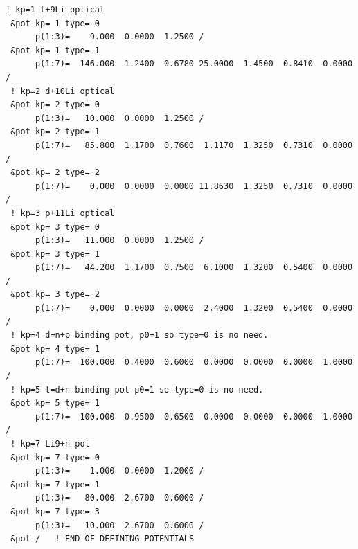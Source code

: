 \documentclass[11pt]{book}
\begin{document}
\begin{small} 
\begin{lstlisting}[frame=single]
! kp=1 t+9Li optical                                                                                
 &pot kp= 1 type= 0                                                             
      p(1:3)=    9.000  0.0000  1.2500 /                                        
 &pot kp= 1 type= 1                                                             
      p(1:7)=  146.000  1.2400  0.6780 25.0000  1.4500  0.8410  0.0000 /         
 ! kp=2 d+10Li optical
 &pot kp= 2 type= 0                                                             
      p(1:3)=   10.000  0.0000  1.2500 /                                        
 &pot kp= 2 type= 1                                                             
      p(1:7)=   85.800  1.1700  0.7600  1.1170  1.3250  0.7310  0.0000 /        
 &pot kp= 2 type= 2                                                             
      p(1:7)=    0.000  0.0000  0.0000 11.8630  1.3250  0.7310  0.0000 /        
 ! kp=3 p+11Li optical
 &pot kp= 3 type= 0                                                             
      p(1:3)=   11.000  0.0000  1.2500 /                                        
 &pot kp= 3 type= 1                                                             
      p(1:7)=   44.200  1.1700  0.7500  6.1000  1.3200  0.5400  0.0000 /        
 &pot kp= 3 type= 2                                                             
      p(1:7)=    0.000  0.0000  0.0000  2.4000  1.3200  0.5400  0.0000 /        
 ! kp=4 d=n+p binding pot, p0=1 so type=0 is no need.
 &pot kp= 4 type= 1                                                             
      p(1:7)=  100.000  0.4000  0.6000  0.0000  0.0000  0.0000  1.0000 /        
 ! kp=5 t=d+n binding pot p0=1 so type=0 is no need.
 &pot kp= 5 type= 1                                                             
      p(1:7)=  100.000  0.9500  0.6500  0.0000  0.0000  0.0000  1.0000 /        
 ! kp=7 Li9+n pot
 &pot kp= 7 type= 0                                                             
      p(1:3)=    1.000  0.0000  1.2000 /                                        
 &pot kp= 7 type= 1                                                             
      p(1:3)=   80.000  2.6700  0.6000 /                                        
 &pot kp= 7 type= 3                                                             
      p(1:3)=   10.000  2.6700  0.6000 /                                        
 &pot /   ! END OF DEFINING POTENTIALS                                          
\end{lstlisting}
\end{small}
\end{document}
